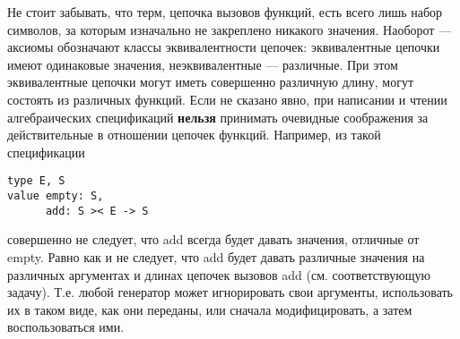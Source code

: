 


Не стоит забывать, что терм, цепочка вызовов функций, есть всего лишь набор символов, за которым изначально не закреплено никакого значения. Наоборот --- аксиомы обозначают классы эквивалентности цепочек: эквивалентные цепочки имеют одинаковые значения, неэквивалентные --- различные. При этом эквивалентные цепочки могут иметь совершенно различную длину, могут состоять из различных функций. Если не сказано явно, при написании и чтении алгебраических спецификаций \textbf{нельзя} принимать очевидные соображения за действительные в отношении цепочек функций. Например, из такой спецификации
\begin{lstlisting}
type E, S
value empty: S,
      add: S >< E -> S
\end{lstlisting}
совершенно не следует, что add всегда будет давать значения, отличные от empty. Равно как и не следует, что add будет давать различные значения на различных аргументах и длинах цепочек вызовов add (см. соответствующую задачу). Т.е. любой генератор может игнорировать свои аргументы, использовать их в таком виде, как они переданы, или сначала модифицировать, а затем воспользоваться ими.

